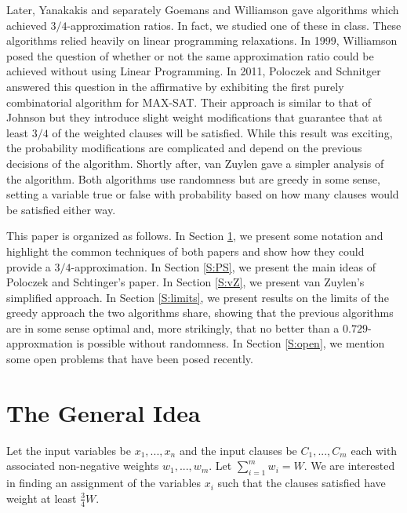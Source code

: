 \documentclass[11pt,letter]{article}
\begin{document}
Later, Yanakakis \cite{Yannakakis1994475} and separately Goemans and Williamson \cite{Goemans94new3/4-approximation}
gave algorithms which achieved $3/4$-approximation ratios. In fact, we studied one of these in class.
These algorithms relied heavily on linear programming relaxations. In 1999, Williamson posed the question
of whether or not the same approximation ratio could be achieved without using Linear Programming. In 2011,
Poloczek and Schnitger \cite{Poloczek:2011:RVJ:2133036.2133087} answered this question in the affirmative
by exhibiting the first purely combinatorial algorithm for MAX-SAT. Their approach is similar to that of Johnson
but they introduce slight weight modifications that guarantee that at least $3/4$ of the weighted clauses will be satisfied.
While this result was exciting, the probability modifications are complicated and depend on the previous decisions
of the algorithm. Shortly after, van Zuylen \cite{vanZuylen:2011:SAM:2238496.2238512} gave a simpler analysis of the algorithm.
Both algorithms use randomness but are greedy in some sense,
setting a variable true or false with probability based on
how many clauses would be satisfied either way.

This paper is organized as follows.
In Section \ref{S:idea}, we present some notation and highlight the common techniques of both papers
and show how they could provide a $3/4$-approximation.
In Section \ref{S:PS}, we present the main ideas of Poloczek and Schtinger's paper.
In Section \ref{S:vZ}, we present van Zuylen's simplified approach.
In Section \ref{S:limits}, we present results on the limits of
the greedy approach the two algorithms share,
showing that the previous algorithms are in some sense optimal
and, more strikingly,
that no better than a $0.729$-approxmation is possible without randomness.
In Section \ref{S:open}, we mention some open problems that have been posed recently.


\section{The General Idea}\label{S:idea}

Let the input variables be $x_1,...,x_n$ and the input clauses be $C_1,...,C_m$
each with associated non-negative weights $w_1,...,w_m$. Let $\sum_{i=1}^{m} w_i = W$.
We are interested in finding an assignment of the variables $x_i$ such that the clauses satisfied have weight at least $\frac{3}{4}W$.
\end{document}
